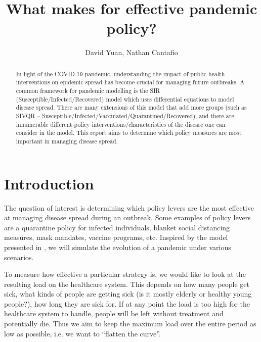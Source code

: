 \documentclass[12pt,a4paper]{article}
\title{What makes for effective pandemic policy?}
\author{David Yuan, Nathan Cantafio}
\date{}  %
\begin{document}
\maketitle

\begin{abstract}
In light of the COVID-19 pandemic, understanding the impact of public health interventions on epidemic spread has become crucial for managing future outbreaks. A common framework for pandemic modelling is the SIR (Susceptible/Infected/Recovered) model which uses differential equations to model disease spread. There are many extensions of this model that add more groups (such as SIVQR -- Susceptible/Infected/Vaccinated/Quarantined/Recovered), and there are innumerable different policy interventions/characteristics of the disease one can consider in the model. This report aims to determine which policy measures are most important in managing disease spread.
\end{abstract} 

\section{Introduction}\label{section1}


The question of interest is determining which policy levers are the most effective at managing disease spread during an outbreak. Some examples of policy levers are a quarantine policy for infected individuals, blanket social distancing measures, mask mandates, vaccine programs, etc. Inspired by the model presented in \cite{TURKYILMAZOGLU2022127429}, we will simulate the evolution of a pandemic under various scenarios. 

To measure how effective a particular strategy is, we would like to look at the resulting load on the healthcare system. This depends on how many people get sick, what kinds of people are getting sick (is it mostly elderly or healthy young people?), how long they are sick for. If at any point the load is too high for the healthcare system to handle, people will be left without treatment and potentially die. Thus we aim to keep the maximum load over the entire period as low as possible, i.e. we want to ``flatten the curve''.
\end{document}
